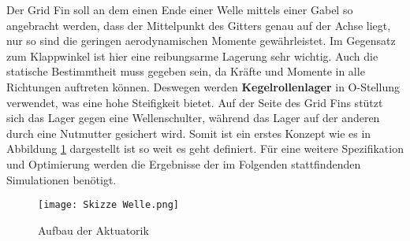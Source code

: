 Der Grid Fin soll an dem einen Ende einer Welle mittels einer Gabel so angebracht werden, dass der Mittelpunkt des Gitters genau auf der Achse liegt, nur so sind die geringen aerodynamischen Momente gewährleistet. Im Gegensatz zum Klappwinkel ist hier eine reibungsarme Lagerung sehr wichtig. Auch die statische Bestimmtheit muss gegeben sein, da Kräfte und Momente in alle Richtungen auftreten können. Deswegen werden \textbf{Kegelrollenlager} in O-Stellung verwendet, was eine hohe Steifigkeit bietet. Auf der Seite des Grid Fins stützt sich das Lager gegen eine Wellenschulter, während das Lager auf der anderen durch eine Nutmutter gesichert wird.
Somit ist ein erstes Konzept wie es in Abbildung \ref{abb_Welle} dargestellt ist so weit es geht definiert. Für eine weitere Spezifikation und Optimierung werden die Ergebnisse der im Folgenden stattfindenden Simulationen benötigt.
\begin{figure}[h]
	\centering
	\texttt{[image: Skizze Welle.png]}
	\caption{Aufbau der Aktuatorik}
	\label{abb_Welle}
\end{figure}\\
